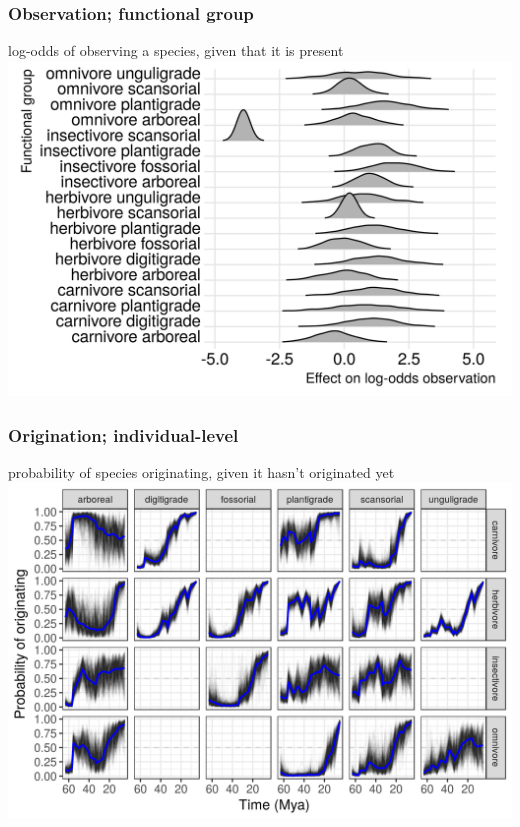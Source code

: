 \documentclass[aspectratio=169]{beamer}
\begin{document}
\begin{frame}
  \frametitle{Observation; functional group}
  \begin{center}
    log-odds of observing a species, given that it is present
    \includegraphics[height=0.775\textheight,width=\textwidth,keepaspectratio=true]{figure/ecotype_observation}
  \end{center}
\end{frame}

\begin{frame}
  \frametitle{Origination; individual-level}
  \begin{center}
    probability of species originating, given it hasn't originated yet
    \includegraphics[height=0.775\textheight,width=\textwidth,keepaspectratio=true]{figure/ecotype_origin_bd}
  \end{center}
\end{frame}
\end{document}

